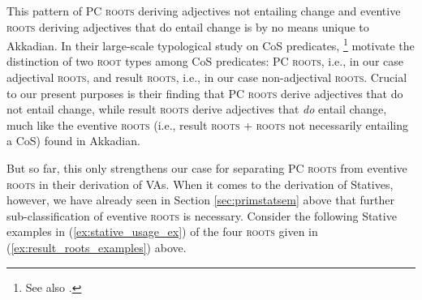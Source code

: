 \documentclass[output=paper,colorlinks,citecolor=brown]{langscibook}
\begin{document}
 This pattern of PC \textsc{roots} deriving adjectives not entailing change and eventive \textsc{roots} deriving adjectives that do entail change is by no means unique to Akkadian. In their large-scale typological study on CoS  predicates, \citet{Beaversetal2021}\footnote{See also \citet{beavers_lexical_2012,BeaversKoontz2020}.} motivate the distinction of two \textsc{root} types among CoS  predicates: PC \textsc{roots}, i.e., in our case adjectival \textsc{roots}, and result \textsc{roots}, i.e., in our case non-adjectival \textsc{roots}. Crucial to our present purposes is their finding that PC \textsc{roots} derive adjectives that do not entail change, while result \textsc{roots} derive adjectives that \textit{do} entail change, much like the eventive \textsc{roots} (i.e., result \textsc{roots} + \textsc{roots} not necessarily entailing a CoS) found in Akkadian.


But so far, this only strengthens our case for separating PC \textsc{roots} from eventive \textsc{roots} in their derivation of VAs. When it comes to the derivation of Statives, however, we have already seen in Section \ref{sec:primstatsem} above that further sub-classification of eventive \textsc{roots} is necessary. Consider the following Stative examples in (\ref{ex:stative_usage_ex}) of the four \textsc{roots} given in (\ref{ex:result_roots_examples}) above.
\end{document}
